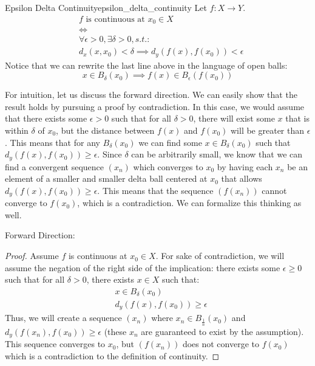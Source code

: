 \begin{thm}{Epsilon Delta Continuity}{epsilon_delta_continuity}
Let \(f: X \to Y\).
\begin{align*}
  &\textrm{\(f\) is continuous at \(x_0\in X\)} \\
  &\iff \\
   &\forall \epsilon > 0, \exists \delta > 0, s.t.:\\
    &d_x(x, x_0) < \delta \implies d_y(f(x), f(x_0)) < \epsilon
\end{align*}
Notice that we can rewrite the last line above in the language of open balls:
\begin{equation*}
  x \in B_\delta(x_0) \implies f(x) \in B_\epsilon(f(x_0))
\end{equation*}

For intuition, let us discuss the forward direction. We can easily show that the result holds by pursuing a proof by contradiction. In this case, we would assume that there exists some \(\epsilon > 0\) such that for all \(\delta > 0\), there will exist some \(x\) that is within \(\delta\) of \(x_0\), but the distance between \(f(x)\) and \(f(x_0)\) will be greater than \(\epsilon\). This means that for any \(B_{\delta}(x_0)\) we can find some \(x \in B_{\delta}(x_0)\) such that \(d_y(f(x), f(x_0)) \geq \epsilon\). Since \(\delta\) can be arbitrarily small, we know that we can find a convergent sequence \((x_n)\) which converges to \(x_0\) by having each \(x_n\) be an element of a smaller and smaller delta ball centered at \(x_0\) that allows \(d_y(f(x), f(x_0)) \geq \epsilon\). This means that the sequence \((f(x_n))\) cannot converge to \(f(x_0)\), which is a contradiction. We can formalize this thinking as well. \newline 

Forward Direction:
\begin{proof}
Assume \(f\) is continuous at \(x_0 \in X\). For sake of contradiction, we will assume the negation of the right side of the implication: there exists some \(\epsilon \geq 0\) such that for all \(\delta > 0\), there exists \(x \in X\) such that:
\begin{align*}
  &x \in B_{\delta}(x_0) \\
  &d_y(f(x), f(x_0)) \geq \epsilon
\end{align*}
Thus, we will create a sequence \((x_n)\) where \(x_n \in B_{\frac{1}{n}}(x_0)\) and \(d_y(f(x_n), f(x_0)) \geq \epsilon\) (these \(x_n\) are guaranteed to exist by the assumption). This sequence converges to \(x_0\), but \((f(x_n))\) does not converge to \(f(x_0)\) which is a contradiction to the definition of continuity.


\end{proof}
\end{thm}
